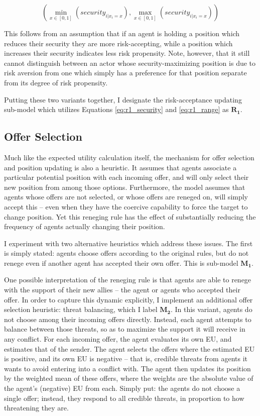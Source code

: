 \begin{equation}
   (\min\limits_{x \in {[0, 1]}} (security_{i|x_i=x}), \max\limits_{x \in {[0, 1]}} (security_{i|x_i=x})) \label{eq:r1_range}
\end{equation}

This follows from an assumption that if an agent is holding a position which reduces their security they are more risk-accepting, while a position which increases their security indicates less risk propensity. Note, however, that it still cannot distinguish between an actor whose security-maximizing position is due to risk aversion from one which simply has a preference for that position separate from its degree of risk propensity. 

Putting these two variants together, I designate the risk-acceptance updating sub-model which utilizes Equations \ref{eq:r1_security} and \ref{eq:r1_range} as $\mathbf{R_1}$.

\subsection{Offer Selection}

Much like the expected utility calculation itself, the mechanism for offer selection and position updating is also a heuristic. It assumes that agents associate a particular potential position with each incoming offer, and will only select their new position from among those options. Furthermore, the model assumes that agents whose offers are not selected, or whose offers are reneged on, will simply accept this -- even when they have the coercive capability to force the target to change position. Yet this reneging rule has the effect of substantially reducing the frequency of agents actually changing their position.

I experiment with two alternative heuristics which address these issues. The first is simply stated: agents choose offers according to the original rules, but do not renege even if another agent has accepted their own offer. This is sub-model $\mathbf{M_1}$.

One possible interpretation of the reneging rule is that agents are able to renege with the support of their new allies -- the agent or agents who accepted their offer. In order to capture this dynamic explicitly, I implement an additional offer selection heuristic: threat balancing, which I label $\mathbf{M_2}$. In this variant, agents do not choose among their incoming offers directly. Instead, each agent attempts to balance between those threats, so as to maximize the support it will receive in any conflict. For each incoming offer, the agent evaluates its own EU, and estimates that of the sender. The agent selects the offers where the estimated EU is positive, and its own EU is negative -- that is, credible threats from agents it wants to avoid entering into a conflict with. The agent then updates its position by the weighted mean of these offers, where the weights are the absolute value of the agent's (negative) EU from each. Simply put: the agents do not choose a single offer; instead, they respond to all credible threats, in proportion to how threatening they are.

